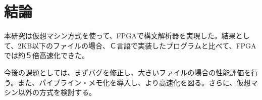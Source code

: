 \documentclass[12pt,oneside]{report}
\begin{document}


\chapter{結論}
\label{conc}

本研究は仮想マシン方式を使って、FPGAで構文解析器を実現した。結果として、2KB以下のファイルの場合、Ｃ言語で実装したプログラムと比べて、FPGAでは約５倍高速化できた。

今後の課題としては、まずバグを修正し、大きいファイルの場合の性能評価を行う。また、パイプライン・メモ化を導入し、より高速化を図る。さらに、仮想マシン以外の方式を検討する。



%
%
\end{document}
